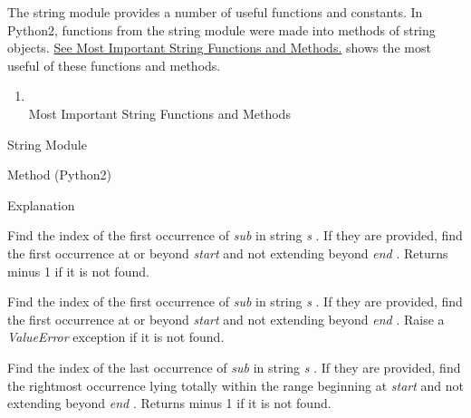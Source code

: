 The string module provides a
number of useful functions and constants. In Python2, functions from the
string module were made into methods of string objects.
\href{chap2.html\#33427}{See Most Important String Functions and
Methods.} shows the most useful of these functions and methods.

\begin{enumerate}
\tightlist
\item
  \\
  Most Important String Functions and Methods
\end{enumerate}

String Module

Method (Python2)

Explanation













Find the index of the first
occurrence of \emph{sub} in string \emph{s} . If they are provided, find
the first occurrence at or beyond \emph{start} and not extending beyond
\emph{end} . Returns minus 1 if it is not found.













Find the index of the first
occurrence of \emph{sub} in string \emph{s} . If they are provided, find
the first occurrence at or beyond \emph{start} and not extending beyond
\emph{end} . Raise a \emph{ValueError} exception if it is not found.













Find the index of the last
occurrence of \emph{sub} in string \emph{s} . If they are provided, find
the rightmost occurrence lying totally within the range beginning at
\emph{start} and not extending beyond \emph{end} . Returns minus 1 if it
is not found.













